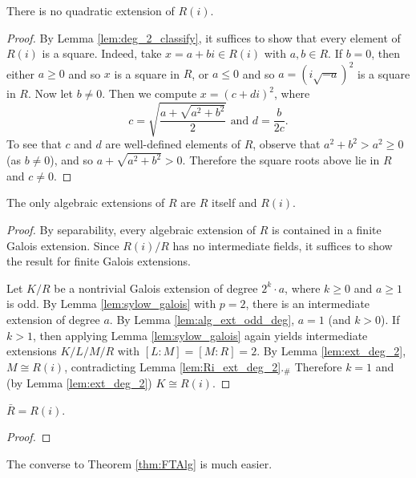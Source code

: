 \begin{lemma}
  \label{lem:Ri_ext_deg_2}
  There is no quadratic extension of $R(i)$.
\end{lemma}
\begin{proof}
  By Lemma \ref{lem:deg_2_classify}, it suffices to show that every element of $R(i)$ is a square. Indeed, take $x=a+bi\in R(i)$ with $a,b\in R$. If $b=0$, then either $a\geq0$ and so $x$ is a square in $R$, or $a\leq0$ and so $a=(i\sqrt{-a})^2$ is a square in $R$. Now let $b\neq0$. Then we compute $x=(c+di)^2$, where
  \[c=\sqrt{\frac{a+\sqrt{a^2+b^2}}{2}}\text{ and }d=\frac{b}{2c}.\]
  To see that $c$ and $d$ are well-defined elements of $R$, observe that $a^2+b^2>a^2\geq0$ (as $b\neq0$), and so $a+\sqrt{a^2+b^2}>0$. Therefore the square roots above lie in $R$ and $c\neq0$.
\end{proof}

\begin{theorem}
  \label{thm:FTAlg}
  The only algebraic extensions of $R$ are $R$ itself and $R(i)$.
\end{theorem}
\begin{proof}
  By separability, every algebraic extension of $R$ is contained in a finite Galois extension. Since $R(i)/R$ has no intermediate fields, it suffices to show the result for finite Galois extensions.
  
  Let $K/R$ be a nontrivial Galois extension of degree $2^k\cdot a$, where $k\geq 0$ and $a\geq1$ is odd. By Lemma \ref{lem:sylow_galois} with $p=2$, there is an intermediate extension of degree $a$. By Lemma \ref{lem:alg_ext_odd_deg}, $a=1$ (and $k>0$). If $k>1$, then applying Lemma \ref{lem:sylow_galois} again yields intermediate extensions $K/L/M/R$ with $[L:M]=[M:R]=2$. By Lemma \ref{lem:ext_deg_2}, $M\cong R(i)$, contradicting Lemma \ref{lem:Ri_ext_deg_2}.$_\#$ Therefore $k=1$ and (by Lemma \ref{lem:ext_deg_2}) $K\cong R(i)$.
\end{proof}

\begin{corollary}
  \label{cor:RCF_ac}
  $\bar{R}=R(i)$.
\end{corollary}
\begin{proof}
\end{proof}

The converse to Theorem \ref{thm:FTAlg} is much easier.

